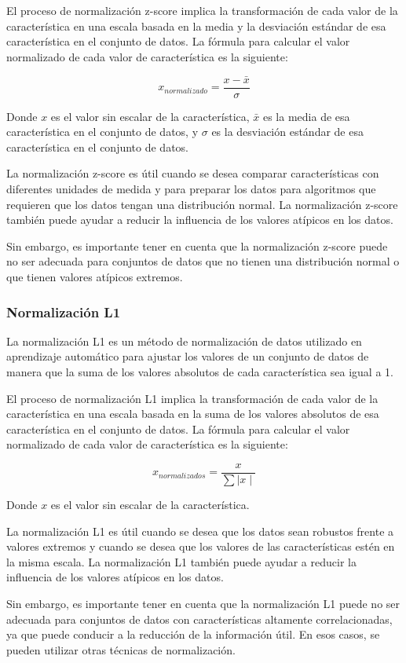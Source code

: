 El proceso de normalización z-score implica la transformación de cada valor de la característica en una escala basada en la media y la desviación estándar de esa característica en el conjunto de datos. La fórmula para calcular el valor normalizado de cada valor de característica es la siguiente:

$$x_{normalizado} = \frac{x-\bar{x}}{\sigma}$$

Donde $x$ es el valor sin escalar de la característica, $\bar{x}$ es la media de esa característica en el conjunto de datos, y $\sigma$ es la desviación estándar de esa característica en el conjunto de datos.

La normalización z-score es útil cuando se desea comparar características con diferentes unidades de medida y para preparar los datos para algoritmos que requieren que los datos tengan una distribución normal. La normalización z-score también puede ayudar a reducir la influencia de los valores atípicos en los datos.

Sin embargo, es importante tener en cuenta que la normalización z-score puede no ser adecuada para conjuntos de datos que no tienen una distribución normal o que tienen valores atípicos extremos.

\subsubsection{Normalización L1}
La normalización L1 es un método de normalización de datos utilizado en aprendizaje automático para ajustar los valores de un conjunto de datos de manera que la suma de los valores absolutos de cada característica sea igual a 1.

El proceso de normalización L1 implica la transformación de cada valor de la característica en una escala basada en la suma de los valores absolutos de esa característica en el conjunto de datos. La fórmula para calcular el valor normalizado de cada valor de característica es la siguiente:

$$x_{normalizados} = \frac{x}{\sum \mid x \mid}$$

Donde $x$ es el valor sin escalar de la característica.

La normalización L1 es útil cuando se desea que los datos sean robustos frente a valores extremos y cuando se desea que los valores de las características estén en la misma escala. La normalización L1 también puede ayudar a reducir la influencia de los valores atípicos en los datos.

Sin embargo, es importante tener en cuenta que la normalización L1 puede no ser adecuada para conjuntos de datos con características altamente correlacionadas, ya que puede conducir a la reducción de la información útil. En esos casos, se pueden utilizar otras técnicas de normalización.

